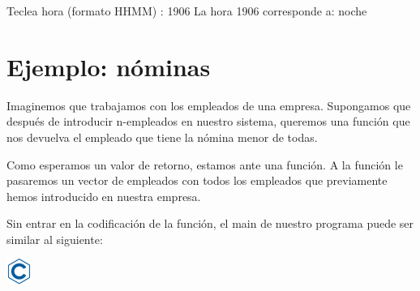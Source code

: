 \documentclass[
]{book}
\newenvironment{Shaded}{\begin{snugshade}}{\end{snugshade}}
\newcommand{\DecValTok}[1]{\textcolor[rgb]{0.00,0.00,0.81}{#1}}
\newcommand{\NormalTok}[1]{#1}
\begin{document}
\begin{Shaded}
\begin{Highlighting}[]
\NormalTok{Teclea hora (formato HHMM) : }\DecValTok{1906}
\NormalTok{La hora }\DecValTok{1906}\NormalTok{ corresponde a: noche }
\end{Highlighting}
\end{Shaded}

\hypertarget{ejemplo-nuxf3minas-1}{%
\section{Ejemplo: nóminas}\label{ejemplo-nuxf3minas-1}}

Imaginemos que trabajamos con los empleados de una empresa. Supongamos que después de introducir n-empleados en nuestro sistema, queremos una función que nos devuelva el empleado que tiene la nómina menor de todas.

Como esperamos un valor de retorno, estamos ante una función. A la función le pasaremos un vector de empleados con todos los empleados que previamente hemos introducido en nuestra empresa.

Sin entrar en la codificación de la función, el main de nuestro programa puede ser similar al siguiente:

\includegraphics{./img/c.png}
\end{document}
